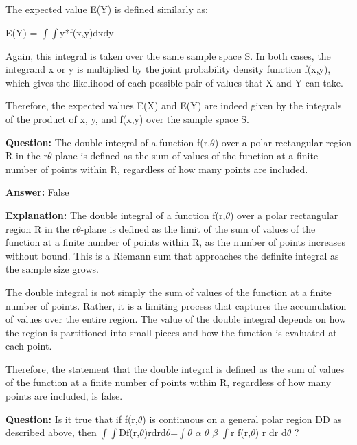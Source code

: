 \documentclass{article}
\begin{document}
The expected value E(Y) is defined similarly as:

E(Y) = \ensuremath{\int}\ensuremath{\int}y*f(x,y)dxdy

Again, this integral is taken over the same sample space S. In both cases, the integrand x or y is multiplied by the joint probability density function f(x,y), which gives the likelihood of each possible pair of values that X and Y can take.

Therefore, the expected values E(X) and E(Y) are indeed given by the integrals of the product of x, y, and f(x,y) over the sample space S.
                
                \vspace{0.5cm} 
        
            
                \textbf {Question:} The double integral of a function f(r,\ensuremath{\theta}) over a polar rectangular region R in the r\ensuremath{\theta}-plane is defined as the sum of values of the function at a finite number of points within R, regardless of how many points are included.
                
                \textbf{Answer:} False

                \textbf{Explanation:} The double integral of a function f(r,\ensuremath{\theta}) over a polar rectangular region R in the r\ensuremath{\theta}-plane is defined as the limit of the sum of values of the function at a finite number of points within R, as the number of points increases without bound. This is a Riemann sum that approaches the definite integral as the sample size grows.

The double integral is not simply the sum of values of the function at a finite number of points. Rather, it is a limiting process that captures the accumulation of values over the entire region. The value of the double integral depends on how the region is partitioned into small pieces and how the function is evaluated at each point.

Therefore, the statement that the double integral is defined as the sum of values of the function at a finite number of points within R, regardless of how many points are included, is false.
                
                \vspace{0.5cm} 
        
            
                \textbf {Question:} Is it true that if f(r,\ensuremath{\theta}) is continuous on a general polar region DD as described above, then \ensuremath{\int}\ensuremath{\int}Df(r,\ensuremath{\theta})rdrd\ensuremath{\theta}=\ensuremath{\int}\ensuremath{\theta} \ensuremath{\alpha} \ensuremath{\theta} \ensuremath{\beta} \ensuremath{\int}r f(r,\ensuremath{\theta}) r dr d\ensuremath{\theta} ?
                
\end{document}
